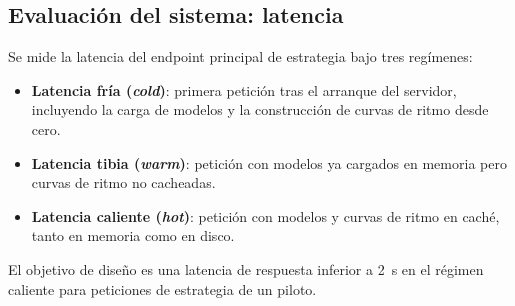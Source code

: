 \subsection{Evaluación del sistema: latencia}
\label{ssec:metricas_latencia}
Se mide la latencia del endpoint principal de estrategia bajo tres regímenes:
\begin{itemize}
    \item \textbf{Latencia fría (\textit{cold})}: primera petición tras el arranque del servidor, incluyendo la carga de modelos y la construcción de curvas de ritmo desde cero.
    \item \textbf{Latencia tibia (\textit{warm})}: petición con modelos ya cargados en memoria pero curvas de ritmo no cacheadas.
    \item \textbf{Latencia caliente (\textit{hot})}: petición con modelos y curvas de ritmo en caché, tanto en memoria como en disco.
\end{itemize}
El objetivo de diseño es una latencia de respuesta inferior a 2~s en el régimen caliente para peticiones de estrategia de un piloto.
